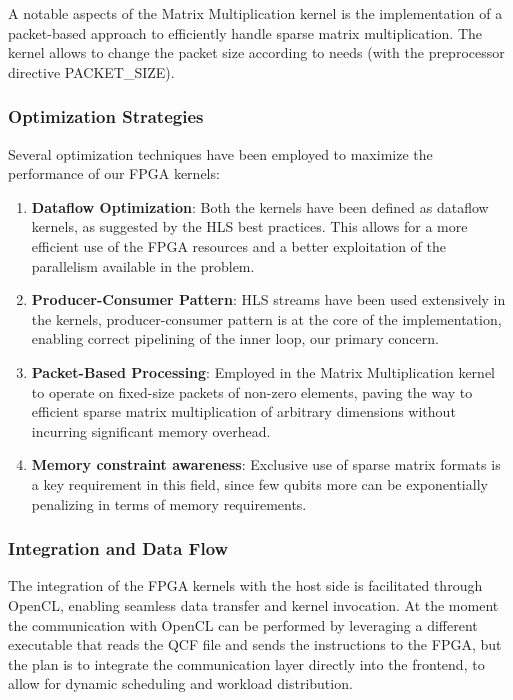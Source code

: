 \documentclass[12pt,oneside,a4paper]{article}
\begin{document}
A notable aspects of the Matrix Multiplication kernel is the implementation of a packet-based approach to efficiently handle sparse matrix multiplication. The kernel allows to change the packet size according to needs (with the preprocessor directive PACKET\_SIZE).


\subsubsection{Optimization Strategies}

Several optimization techniques have been employed to maximize the performance of our FPGA kernels:

\begin{enumerate}
    \item \textbf{Dataflow Optimization}: Both the kernels have been defined as dataflow kernels, as suggested by the HLS best practices. This allows for a more efficient use of the FPGA resources and a better exploitation of the parallelism available in the problem.
    \item \textbf{Producer-Consumer Pattern}: HLS streams have been used extensively in the kernels, producer-consumer pattern is at the core of the implementation, enabling correct pipelining of the inner loop, our primary concern.
    \item \textbf{Packet-Based Processing}: Employed in the Matrix Multiplication kernel to operate on fixed-size packets of non-zero elements, paving the way to efficient sparse matrix multiplication of arbitrary dimensions without incurring significant memory overhead.
    \item \textbf{Memory constraint awareness}: Exclusive use of sparse matrix formats is a key requirement in this field, since few qubits more can be exponentially penalizing in terms of memory requirements.
\end{enumerate}

\subsubsection{Integration and Data Flow}

The integration of the FPGA kernels with the host side is facilitated through OpenCL, enabling seamless data transfer and kernel invocation. At the moment the communication with OpenCL can be performed by leveraging a different executable that reads the QCF file and sends the instructions to the FPGA, but the plan is to integrate the communication layer directly into the frontend, to allow for dynamic scheduling and workload distribution.
\end{document}
